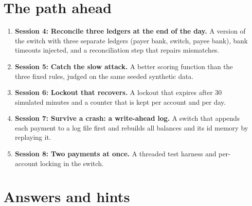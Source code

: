 \documentclass[11pt,a4paper]{article}
\begin{document}
\section{The path ahead}
\begin{enumerate}[nosep]
\item \textbf{Session 4: Reconcile three ledgers at the end of the day.} A version of the switch with three separate ledgers (payer bank, switch, payee bank), bank timeouts injected, and a reconciliation step that repairs mismatches.
\item \textbf{Session 5: Catch the slow attack.} A better scoring function than the three fixed rules, judged on the same seeded synthetic data.
\item \textbf{Session 6: Lockout that recovers.} A lockout that expires after 30 simulated minutes and a counter that is kept per account and per day.
\item \textbf{Session 7: Survive a crash: a write-ahead log.} A switch that appends each payment to a log file first and rebuilds all balances and its id memory by replaying it.
\item \textbf{Session 8: Two payments at once.} A threaded test harness and per-account locking in the switch.
\end{enumerate}

\section{Answers and hints}
\end{document}
